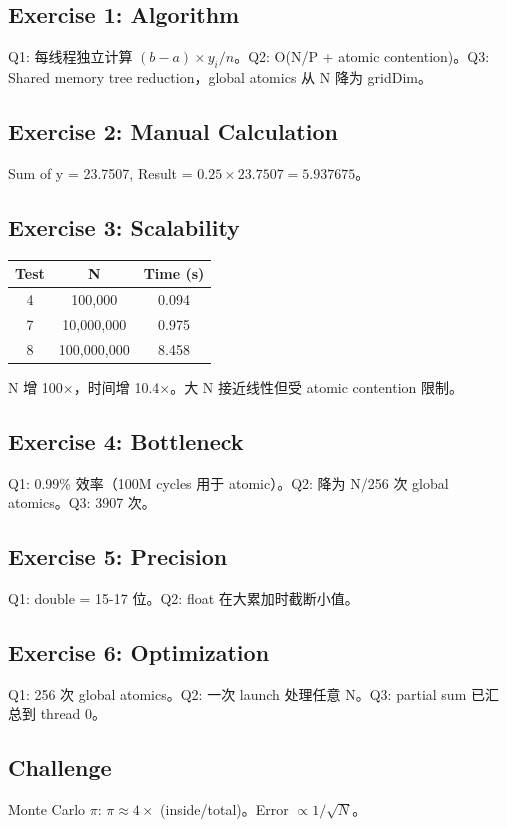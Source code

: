 \documentclass[a4paper]{article}
\begin{document}
\subsection*{Exercise 1: Algorithm}
Q1: 每线程独立计算 $(b-a)\times y_i/n$。Q2: O(N/P + atomic contention)。Q3: Shared memory tree reduction，global atomics 从 N 降为 gridDim。

\subsection*{Exercise 2: Manual Calculation}
Sum of y = 23.7507, Result = $0.25 \times 23.7507 = 5.937675$。

\subsection*{Exercise 3: Scalability}
\begin{tabular}{|c|c|c|}
\hline
Test & N & Time (s) \\
\hline
4 & 100,000 & 0.094 \\
7 & 10,000,000 & 0.975 \\
8 & 100,000,000 & 8.458 \\
\hline
\end{tabular}
N 增 100$\times$，时间增 10.4$\times$。大 N 接近线性但受 atomic contention 限制。

\subsection*{Exercise 4: Bottleneck}
Q1: 0.99\% 效率（100M cycles 用于 atomic）。Q2: 降为 N/256 次 global atomics。Q3: 3907 次。

\subsection*{Exercise 5: Precision}
Q1: double = 15-17 位。Q2: float 在大累加时截断小值。

\subsection*{Exercise 6: Optimization}
Q1: 256 次 global atomics。Q2: 一次 launch 处理任意 N。Q3: partial sum 已汇总到 thread 0。

\subsection*{Challenge}
Monte Carlo $\pi$: $\pi \approx 4\times$ (inside/total)。Error $\propto 1/\sqrt{N}$。
\end{document}

